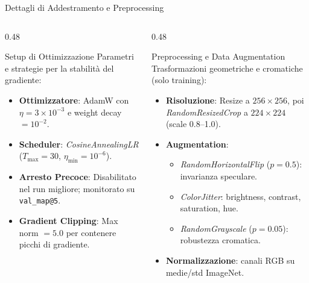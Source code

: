 \documentclass[aspectratio=169, 10pt]{beamer}
\begin{document}
\begin{frame}{Dettagli di Addestramento e Preprocessing}
\begin{columns}[T, onlytextwidth]

\begin{column}{0.48\textwidth}
    \begin{block}{\small Setup di Ottimizzazione}
        \scriptsize
        Parametri e strategie per la stabilità del gradiente:
    \end{block}

    \smallskip
    \begin{itemize}
        \setlength{\itemsep}{3pt}
        \setlength{\parskip}{0pt}
        \scriptsize
        \item \textbf{Ottimizzatore}: AdamW con $\eta = 3\!\times\!10^{-3}$ e weight decay $= 10^{-2}$.
        \item \textbf{Scheduler}: \emph{CosineAnnealingLR} ($T_{\max}=30$, $\eta_{\min}=10^{-6}$).
        \item \textbf{Arresto Precoce}: Disabilitato nel run migliore; monitorato su \texttt{val\_map@5}.
        \item \textbf{Gradient Clipping}: Max norm $= 5.0$ per contenere picchi di gradiente.
    \end{itemize}
\end{column}

\begin{column}{0.48\textwidth}
    \begin{block}{\small Preprocessing e Data Augmentation}
        \scriptsize
        Trasformazioni geometriche e cromatiche (solo training):
    \end{block}

    \smallskip
    \begin{itemize}
        \setlength{\itemsep}{3pt}
        \setlength{\parskip}{0pt}
        \scriptsize
        \item \textbf{Risoluzione}: Resize a $256\!\times\!256$, poi \emph{RandomResizedCrop} a $224\!\times\!224$ (scale 0.8–1.0).
        \item \textbf{Augmentation}:
            \begin{itemize}
                \scriptsize
                \item \emph{RandomHorizontalFlip} ($p=0.5$): invarianza speculare.
                \item \emph{ColorJitter}: brightness, contrast, saturation, hue.
                \item \emph{RandomGrayscale} ($p=0.05$): robustezza cromatica.
            \end{itemize}
        \item \textbf{Normalizzazione}: canali RGB su medie/std ImageNet.
    \end{itemize}
\end{column}
\end{columns}
\end{frame}
\end{document}
